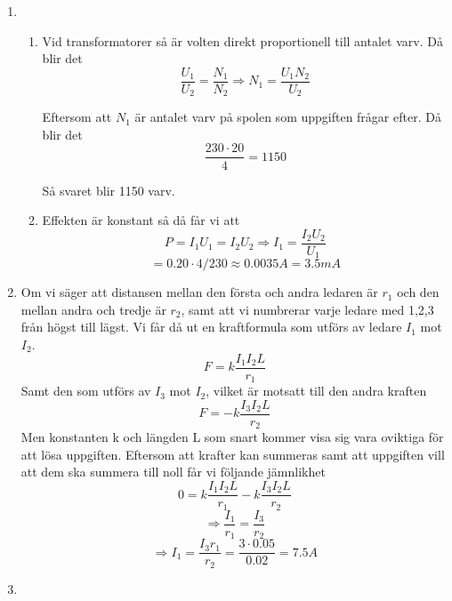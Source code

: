 \documentclass[a4paper,12pt]{article}
\begin{document}
\begin{enumerate}
      \item
            \begin{enumerate}
                  \item
                        Vid transformatorer så är volten direkt proportionell till antalet varv.
                        Då blir det $$\frac{U_1}{U_2}=\frac{N_1}{N_2}\Rightarrow N_1=\frac{U_1N_2}{U_2}$$

                        Eftersom att $N_1$ är antalet varv på spolen som uppgiften frågar efter.
                        Då blir det
                        $$\frac{230\cdot 20}{4}=1150$$

                        Så svaret blir 1150 varv.
                  \item Effekten är konstant så då får vi att $$P=I_1U_1=I_2U_2\Rightarrow I_1=\frac{I_2U_2}{U_1}$$
                        $$=0.20\cdot 4 / 230 \approx 0.0035A=3.5mA$$
            \end{enumerate}

      \item Om vi säger att distansen mellan den första och andra ledaren är $r_1$ och
            den mellan andra och tredje är $r_2$, samt att vi numbrerar varje ledare
            med 1,2,3 från högst till lägst. Vi får då ut en kraftformula som utförs
            av ledare $I_1$ mot $I_2$.
            $$F=k\frac{I_1I_2L}{r_1}$$
            Samt den som utförs av $I_3$ mot $I_2$, vilket är motsatt till den andra kraften
            $$F=-k\frac{I_3I_2L}{r_2}$$
            Men konstanten k och längden L som snart kommer visa sig vara oviktiga för att lösa uppgiften.
            Eftersom att krafter kan summeras samt att uppgiften vill att dem ska summera
            till noll får vi följande jämnlikhet
            $$0=k\frac{I_1I_2L}{r_1}-k\frac{I_3I_2L}{r_2}$$
            $$\Rightarrow\frac{I_1}{r_1}=\frac{I_3}{r_2}$$
            $$\Rightarrow I_1 = \frac{I_3r_1}{r_2}=\frac{3\cdot 0.05}{0.02}=7.5A$$

      \item
\end{enumerate}
\end{document}
